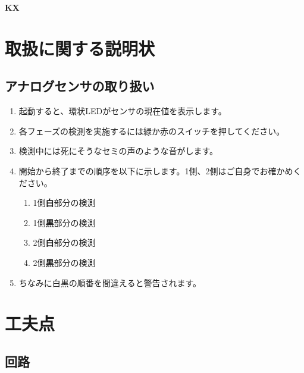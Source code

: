 \documentclass[a4paper]{ltjsarticle}
\newcommand{\kasix}{\textbf{K\hspace{-0.31em}\raisebox{0.17em}{\scalebox{0.7}{A}}\hspace{-0.11em}{S}\hspace{-0.08em}\scalebox{0.8}{i}\hspace{-0.1em}X}}
\begin{document}
\kasix

\section{取扱に関する説明状}
\subsection{アナログセンサの取り扱い}
\begin{enumerate}
  \item 起動すると、環状LEDがセンサの現在値を表示します。
  \item 各フェーズの検測を実施するには緑か赤のスイッチを押してください。
  \item 検測中には死にそうなセミの声のような音がします。
  \item 開始から終了までの順序を以下に示します。1側、2側はご自身でお確かめください。
  \begin{enumerate}
    \item 1側\textbf{白}部分の検測
    \item 1側\textbf{黒}部分の検測
    \item 2側\textbf{白}部分の検測
    \item 2側\textbf{黒}部分の検測
  \end{enumerate}
  \item ちなみに白黒の順番を間違えると警告されます。
\end{enumerate}

\section{工夫点}
\subsection{回路}
\end{document}
